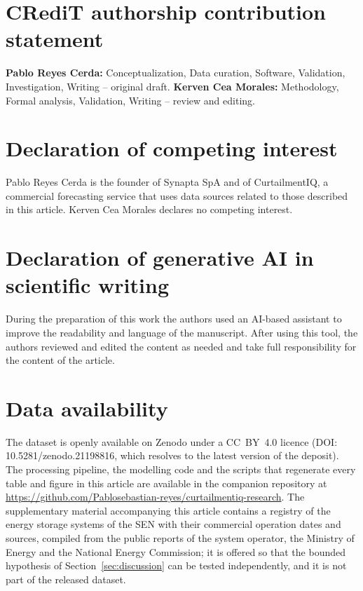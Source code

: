 \documentclass[preprint,3p,times]{elsarticle}
\begin{document}
\section*{CRediT authorship contribution statement}
\textbf{Pablo Reyes Cerda:} Conceptualization, Data curation, Software, Validation, Investigation, Writing -- original draft. \textbf{Kerven Cea Morales:} Methodology, Formal analysis, Validation, Writing -- review and editing.

\section*{Declaration of competing interest}
Pablo Reyes Cerda is the founder of Synapta SpA and of CurtailmentIQ, a commercial forecasting service that uses data sources related to those described in this article. Kerven Cea Morales declares no competing interest.

\section*{Declaration of generative AI in scientific writing}
During the preparation of this work the authors used an AI-based assistant to improve the readability and language of the manuscript. After using this tool, the authors reviewed and edited the content as needed and take full responsibility for the content of the article.

\section*{Data availability}
The dataset is openly available on Zenodo under a CC~BY~4.0 licence (DOI: 10.5281/zenodo.21198816, which resolves to the latest version of the deposit). The processing pipeline, the modelling code and the scripts that regenerate every table and figure in this article are available in the companion repository at \url{https://github.com/Pablosebastian-reyes/curtailmentiq-research}. The supplementary material accompanying this article contains a registry of the energy storage systems of the SEN with their commercial operation dates and sources, compiled from the public reports of the system operator, the Ministry of Energy and the National Energy Commission; it is offered so that the bounded hypothesis of Section~\ref{sec:discussion} can be tested independently, and it is not part of the released dataset.

\appendix
\end{document}
